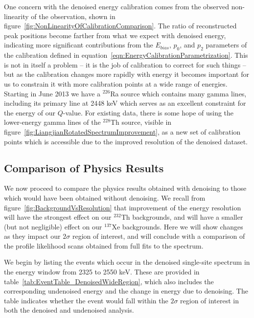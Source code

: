 One concern with the denoised energy calibration comes from the observed non-linearity of the observation, shown in figure~\ref{fig:NonLinearityOfCalibrationComparison}.  The ratio of reconstructed peak positions become farther from what we expect with denoised energy, indicating more significant contributions from the $E_{bias}$, $p_0$, and $p_2$ parameters of the calibration defined in equation~\ref{eqn:EnergyCalibrationParametrization}.  This is not in itself a problem -- it is the job of calibration to correct for such things -- but as the calibration changes more rapidly with energy it becomes important for us to constrain it with more calibration points at a wide range of energies.  Starting in June 2013 we have a $^{226}$Ra source which contains many gamma lines, including its primary line at 2448 keV which serves as an excellent constraint for the energy of our $Q$-value.  For existing data, there is some hope of using the lower-energy gamma lines of the $^{228}$Th source, visible in figure~\ref{fig:LiangjianRotatedSpectrumImprovement}, as a new set of calibration points which is accessible due to the improved resolution of the denoised dataset.

\subsection{Comparison of Physics Results}\label{sec:ResultComparisonPhysics}

We now proceed to compare the physics results obtained with denoising to those which would have been obtained without denoising.  We recall from figure~\ref{fig:BackgroundVsResolution} that improvement of the energy resolution will have the strongest effect on our $^{232}$Th backgrounds, and will have a smaller (but not negligible) effect on our $^{137}$Xe backgrounds.  Here we will show changes as they impact our $2\sigma$ region of interest, and will conclude with a comparison of the profile likelihood scans obtained from full fits to the spectrum.

We begin by listing the events which occur in the denoised single-site spectrum in the energy window from 2325 to 2550 keV.  These are provided in table~\ref{tab:EventTable_DenoisedWideRegion}, which also includes the corresponding undenoised energy and the change in energy due to denoising.  The table indicates whether the event would fall within the $2\sigma$ region of interest in both the denoised and undenoised analysis.

